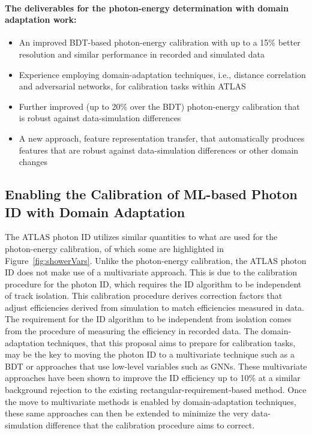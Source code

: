 \documentclass[letter, USenglish, 11pt, subfigure]{article}
\begin{document}
\paragraph{The deliverables for the photon-energy determination with domain adaptation work:}
\begin{itemize}
\item An improved BDT-based photon-energy calibration with up to a 15\% better resolution and similar performance in recorded and simulated data
\item Experience employing domain-adaptation techniques, i.e., distance correlation and adversarial networks, for calibration tasks within ATLAS
\item Further improved (up to 20\% over the BDT) photon-energy calibration that is robust against data-simulation differences
\item A new approach, feature representation transfer, that automatically produces features that are robust against data-simulation differences or other domain changes
\end{itemize}

\subsection{Enabling the Calibration of ML-based Photon ID with Domain Adaptation}

The ATLAS photon ID utilizes similar quantities to what are used for the photon-energy calibration, of which some are highlighted in Figure~\ref{fig:showerVars}. Unlike the photon-energy calibration, the ATLAS photon ID does not make use of a multivariate approach. This is due to the calibration procedure for the photon ID, which requires the ID algorithm to be independent of track isolation. This calibration procedure derives correction factors that adjust efficiencies derived from simulation to match efficiencies measured in data. The requirement for the ID algorithm to be independent from isolation comes from the procedure of measuring the efficiency in recorded data. The domain-adaptation techniques, that this proposal aims to prepare for calibration tasks, may be the key to moving the photon ID to a multivariate technique such as a BDT or approaches that use low-level variables such as GNNs. These multivariate approaches have been shown to improve the ID efficiency up to 10\% at a similar background rejection to the existing rectangular-requirement-based method. Once the move to multivariate methods is enabled by domain-adaptation techniques, these same approaches can then be extended to minimize the very data-simulation difference that the calibration procedure aims to correct.
\end{document}
